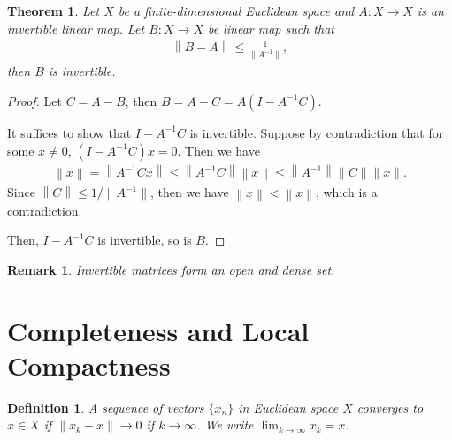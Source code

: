 \documentclass[11pt]{book}
\newtheorem{definition}{Definition}[chapter]
\newtheorem{theorem}{Theorem}[chapter]
\newtheorem{remark}{Remark}[chapter]
\theoremstyle{definition}
\numberwithin{equation}{chapter}
\begin{document}
\medskip

\begin{theorem}
Let $X$ be a finite-dimensional Euclidean space and $A:X\to X$ is an invertible linear map. Let $B:X\to X$ be linear map such that 
\begin{align*}
    \left\|B - A\right\| \leq \frac{1}{\|A^{-1}\|},
\end{align*}
then $B$ is invertible.
\end{theorem}
\begin{proof}
Let $C = A - B$, then $B = A - C = A\left(I - A^{-1}C\right)$. 

It suffices to show that $I - A^{-1}C$ is invertible. Suppose by contradiction that for some $x\neq 0$, $\left(I - A^{-1}C\right)x = 0$. Then we have
\begin{align*}
    \left\|x\right\| = \left\|A^{-1}C x\right\| \leq \left\|A^{-1}C\right\| \left\|x\right\| \leq \left\|A^{-1}\right\| \|C\| \|x\|.
\end{align*}
Since $\left\|C\right\| \leq 1 / \|A^{-1}\|$, then we have $\left\|x\right\| < \left\|x\right\|$, which is a contradiction. 

Then, $I - A^{-1}C$ is invertible, so is $B$.
\end{proof}

\begin{remark}
Invertible matrices form an open and dense set.
\end{remark}

\medskip

\section{Completeness and Local Compactness}

\begin{definition}
A sequence of vectors $\{x_n\}$ in Euclidean space $X$ converges to $x\in X$ if $\|x_k - x\| \to 0$ if $k\to \infty$. We write $\lim_{k\to\infty}x_k = x$.
\end{definition}

\medskip
\end{document}
